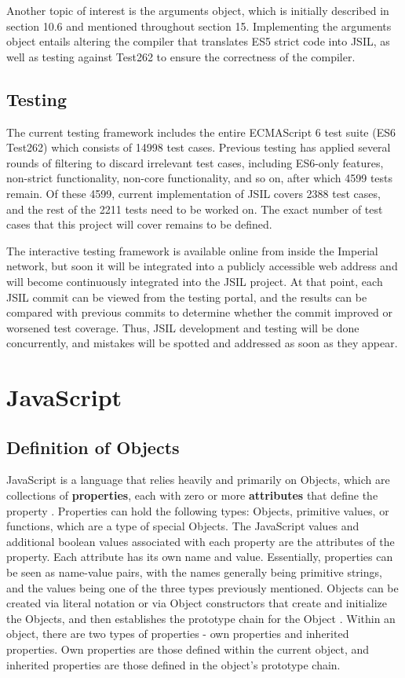 \documentclass[a4paper,11pt,twoside]{report}
\begin{document}
Another topic of interest is the arguments object, which is initially described in section 10.6 and mentioned throughout section 15. Implementing the arguments object entails altering the compiler that translates ES5 strict code into JSIL, as well as testing against Test262 to ensure the correctness of the compiler.

\section{Testing}
The current testing framework includes the entire ECMAScript 6 test suite (ES6 Test262) which consists of 14998 test cases. Previous testing has applied several rounds of filtering to discard irrelevant test cases, including ES6-only features, non-strict functionality, non-core functionality, and so on, after which 4599 tests remain. Of these 4599, current implementation of JSIL covers 2388 test cases, and the rest of the 2211 tests need to be worked on. The exact number of test cases that this project will cover remains to be defined.

The interactive testing framework is available online from inside the Imperial network, but soon it will be integrated into a publicly accessible web address and will become continuously integrated into the JSIL project. At that point, each JSIL commit can be viewed from the testing portal, and the results can be compared with previous commits to determine whether the commit improved or worsened test coverage. Thus, JSIL development and testing will be done concurrently, and mistakes will be spotted and addressed as soon as they appear.

\chapter{JavaScript}\label{sec:javascript}
\section{Definition of Objects}
JavaScript is a language that relies heavily and primarily on Objects, which are collections of \textbf{properties}, each with zero or more \textbf{attributes} that define the property \cite{EcmaScript}. Properties can hold the following types: Objects, primitive values, or functions, which are a type of special Objects. The JavaScript values and additional boolean values associated with each property are the attributes of the property. Each attribute has its own name and value. Essentially, properties can be seen as name-value pairs, with the names generally being primitive strings, and the values being one of the three types previously mentioned. Objects can be created via literal notation or via Object constructors that create and initialize the Objects, and then establishes the prototype chain for the Object \cite{EcmaScript}. Within an object, there are two types of properties - own properties and inherited properties. Own properties are those defined within the current object, and inherited properties are those defined in the object's prototype chain.
\end{document}
